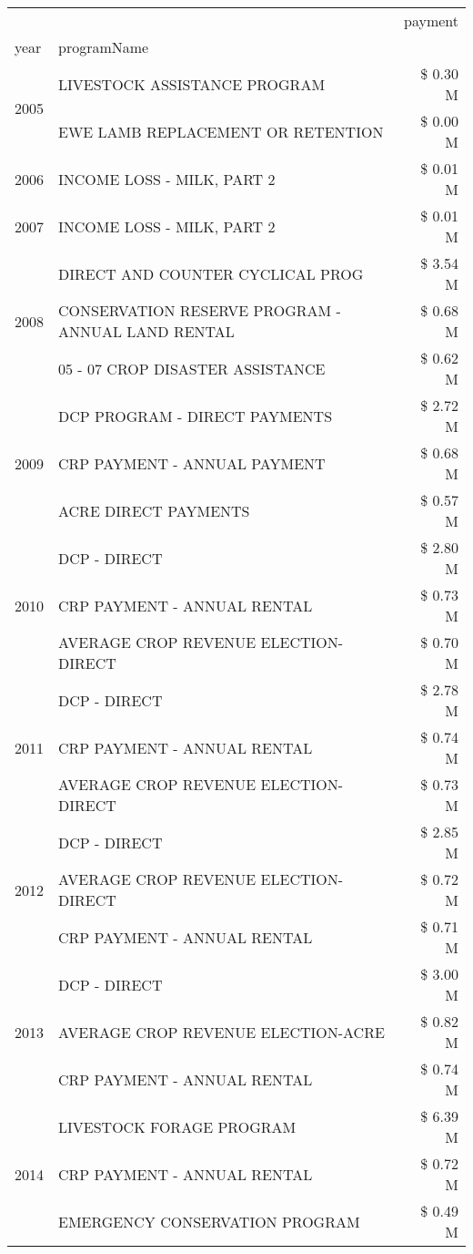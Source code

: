 \begin{tabular}{llr}
\toprule
 &  & payment \\
year & programName &  \\
\midrule
\multirow[t]{2}{*}{2005} & LIVESTOCK ASSISTANCE PROGRAM & \$ 0.30 M \\
 & EWE LAMB REPLACEMENT OR RETENTION & \$ 0.00 M \\
\cline{1-3}
2006 & INCOME LOSS - MILK, PART 2 & \$ 0.01 M \\
\cline{1-3}
2007 & INCOME LOSS - MILK, PART 2 & \$ 0.01 M \\
\cline{1-3}
\multirow[t]{3}{*}{2008} & DIRECT AND COUNTER CYCLICAL PROG & \$ 3.54 M \\
 & CONSERVATION RESERVE PROGRAM - ANNUAL LAND RENTAL & \$ 0.68 M \\
 & 05 - 07 CROP DISASTER ASSISTANCE & \$ 0.62 M \\
\cline{1-3}
\multirow[t]{3}{*}{2009} & DCP PROGRAM - DIRECT PAYMENTS & \$ 2.72 M \\
 & CRP PAYMENT - ANNUAL PAYMENT & \$ 0.68 M \\
 & ACRE DIRECT PAYMENTS & \$ 0.57 M \\
\cline{1-3}
\multirow[t]{3}{*}{2010} & DCP - DIRECT & \$ 2.80 M \\
 & CRP PAYMENT - ANNUAL RENTAL & \$ 0.73 M \\
 & AVERAGE CROP REVENUE ELECTION-DIRECT & \$ 0.70 M \\
\cline{1-3}
\multirow[t]{3}{*}{2011} & DCP - DIRECT & \$ 2.78 M \\
 & CRP PAYMENT - ANNUAL RENTAL & \$ 0.74 M \\
 & AVERAGE CROP REVENUE ELECTION-DIRECT & \$ 0.73 M \\
\cline{1-3}
\multirow[t]{3}{*}{2012} & DCP - DIRECT & \$ 2.85 M \\
 & AVERAGE CROP REVENUE ELECTION-DIRECT & \$ 0.72 M \\
 & CRP PAYMENT - ANNUAL RENTAL & \$ 0.71 M \\
\cline{1-3}
\multirow[t]{3}{*}{2013} & DCP - DIRECT & \$ 3.00 M \\
 & AVERAGE CROP REVENUE ELECTION-ACRE & \$ 0.82 M \\
 & CRP PAYMENT - ANNUAL RENTAL & \$ 0.74 M \\
\cline{1-3}
\multirow[t]{3}{*}{2014} & LIVESTOCK FORAGE PROGRAM & \$ 6.39 M \\
 & CRP PAYMENT - ANNUAL RENTAL & \$ 0.72 M \\
 & EMERGENCY CONSERVATION PROGRAM & \$ 0.49 M \\

\end{tabular}
